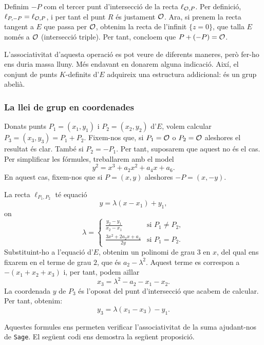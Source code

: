 Definim $-P$ com el tercer punt d'intersecció de la recta $\ell_{\mathcal{O}, P}$. Per definició, $\ell_{P,-P} = \ell_{\mathcal{O}, P}$, i per tant el punt $R$ és justament $\mathcal{O}$. Ara, si prenem la recta tangent a $E$ que passa per $\mathcal{O}$, obtenim la recta de l'infinit $\{ z=0\}$, que talla $E$ només a $\mathcal{O}$ (intersecció triple). Per tant, concloem que $P+(-P)=\mathcal{O}$.

L'associativitat d'aquesta operació es pot veure de diferents maneres, però fer-ho ens duria massa lluny. Més endavant en donarem alguna indicació. Així, el conjunt de punts $K$-definits d'$E$ adquireix una estructura addicional: és un grup abelià.

\subsubsection{La llei de grup en coordenades}
Donats punts $P_1=(x_1,y_1)$ i $P_2=(x_2,y_2)$ d'$E$, volem calcular $P_3=(x_3,y_3)=P_1+P_2$. Fixem-nos que, si $P_1=\mathcal{O}$ o $P_2=\mathcal{O}$ aleshores el resultat és clar. També si $P_2=-P_1$. Per tant, suposarem que aquest no és el cas. Per simplificar les fórmules, treballarem amb el model
\[
y^2=x^3+a_2x^2+a_4x + a_6.
\]
En aquest cas, fixem-nos que si $P=(x,y)$ aleshores $-P=(x,-y)$.

La recta $\ell_{P_1,P_2}$ té equació
\[
y = \lambda (x-x_1) + y_1, 
\]
on
\[
\lambda=\begin{cases}
\frac{y_2-y_1}{x_2-x_1}&\text{si } P_1\neq P_2,\\
\frac{3x^2+2a_2x + a_4}{2y}&\text{si } P_1=P_2.
\end{cases}
\]
Substituint-ho a l'equació d'$E$, obtenim un polinomi de grau $3$ en $x$, del qual ens fixarem en el terme de grau $2$, que és $a_2-\lambda^2$. Aquest terme es correspon a $-(x_1+x_2+x_3)$ i, per tant, podem aïllar
\[
x_3 = \lambda^2-a_2-x_1-x_2.
\]
La coordenada $y$ de $P_3$ és l'oposat del punt d'intersecció que acabem de calcular. Per tant, obtenim:
\[
y_3 = \lambda (x_1-x_3)-y_1.
\]

Aquestes formules ens permeten verificar l'associativitat de la suma ajudant-nos de \texttt{Sage}. El següent codi ens demostra la següent proposició.

